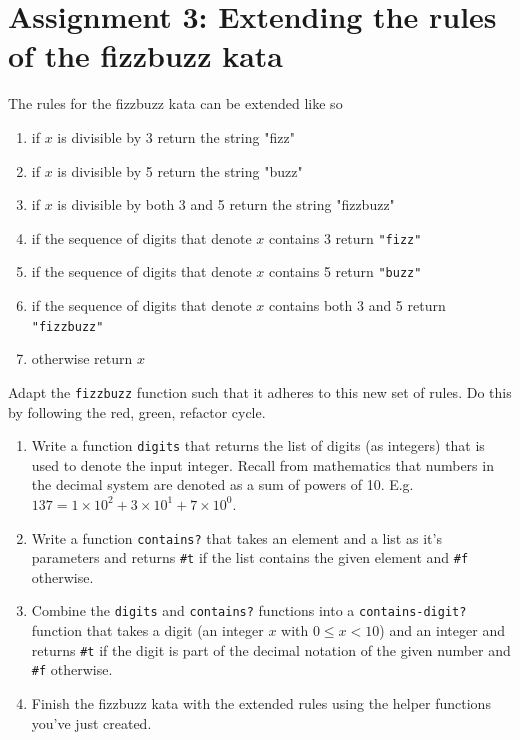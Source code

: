 \documentclass[12pt,a4paper,english,twoside]{article}
\begin{document}
\section{Assignment 3: Extending the rules of the fizzbuzz kata}
The rules for the fizzbuzz kata can be extended like so
\begin{enumerate}
  \item if $x$ is divisible by 3 return the string "fizz"
  \item if $x$ is divisible by 5 return the string "buzz"
  \item if $x$ is divisible by both 3 and 5 return the string "fizzbuzz"
  \item if the sequence of digits that denote $x$ contains 3 return \texttt{"fizz"} 
  \item if the sequence of digits that denote $x$ contains 5 return \texttt{"buzz"} 
  \item if the sequence of digits that denote $x$ contains both 3 and 5 return 
    \texttt{"fizzbuzz"} 
  \item otherwise return $x$
\end{enumerate}
Adapt the \texttt{fizzbuzz} function such that it adheres to this new set of 
rules. Do this by following the red, green, refactor cycle.
\begin{enumerate}
  \item Write a function \texttt{digits} that returns the list of digits (as 
    integers) that is used to denote the input integer. Recall from 
    mathematics that numbers in the decimal system are denoted as a sum of 
    powers of 10. E.g. $137 = 1 \times 10^{2} + 3 \times 10^{1} + 7 \times 
    10^{0}$.
  \item Write a function \texttt{contains?} that takes an element and a list 
    as it's parameters and returns \texttt{\#t} if the list contains the given 
    element and \texttt{\#f} otherwise.
  \item Combine the \texttt{digits} and \texttt{contains?} functions into a 
    \texttt{contains-digit?} function that takes a digit (an integer $x$ with 
    $0 \leq x < 10$) and an integer and returns \texttt{\#t} if the digit is 
    part of the decimal notation of the given number and \texttt{\#f} 
    otherwise.
  \item Finish the fizzbuzz kata with the extended rules using the helper 
    functions you've just created.
\end{enumerate}
\vfill
\pagebreak
\end{document}
